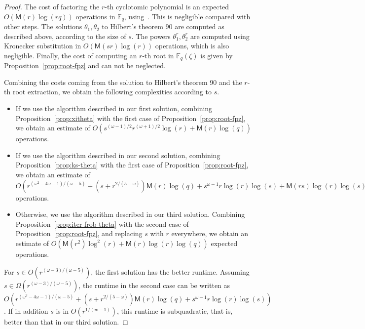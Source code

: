 \documentclass[12pt]{article}
\theoremstyle{plain}
\theoremstyle{definition}
\def\F{\ensuremath{\mathbb{F}}}
\def\MM{\ensuremath{\mathsf{M}}}
\newcounter{algorithm}
\begin{document}
\begin{proof}
  The cost of factoring the $r$-th cyclotomic polynomial is an
  expected $O(\MM(r)\log(rq))$ operations in $\F_q$,
  using~\cite[Theorem~9]{shoup94}. This is negligible compared with
  other steps. The solutions $\theta_1,\theta_2$ to Hilbert's theorem
  90 are computed as described above, according to the size of $s$.
  The powers $\theta_1^r,\theta_2^r$ are computed using Kronecker
  substitution in $O(\MM(sr)\log(r))$ operations, which is also
  negligible. Finally, the cost of computing an $r$-th root in
  $\F_q(\zeta)$ is given by Proposition~\ref{prop:root-fpz} and can
  not be neglected.

  Combining the costs coming from the solution to Hilbert's theorem 90
  and the $r$-th root extraction, we obtain the following complexities
  according to $s$.
  \begin{itemize}
  \item If we use the algorithm described in
    our first solution, combining Proposition~\ref{prop:xitheta} with the first
    case of Proposition~\ref{prop:root-fpz}, we obtain an estimate of
    $O(s^{(\omega-1)/2}r^{(\omega+1)/2}\log(r)+\MM(r)\log(q))$
    operations.
  \item If we use the algorithm described in
    our second solution, combining Proposition~\ref{prop:ks-theta} with the first
    case of Proposition~\ref{prop:root-fpz}, we obtain an estimate of
    $O( r^{(\omega^2-4\omega-1)/(\omega-5)}+(s+r^{2/(5-\omega)})\MM(r)\log(q)
+s^{\omega-1}r\log(r)\log(s)+\MM(rs)\log(r)\log(s))$
    operations.
  \item Otherwise, we use the algorithm described in our third solution. Combining
    Proposition~\ref{prop:iter-frob-theta} with the second case of
    Proposition~\ref{prop:root-fpz}, and replacing $s$ with $r$
    everywhere, we obtain an estimate of
    $O(\MM(r^2)\log^2(r) + \MM(r)\log(r)\log(q)) $ expected operations.
  \end{itemize}
  For $s\in O(r^{(\omega-3)/(\omega-5)})$, the first solution has the
  better runtime. Assuming $s\in \Omega(r^{(\omega-3)/(\omega-5)})$,
  the runtime in the second case can be written as $O(
  r^{(\omega^2-4\omega-1)/(\omega-5)}+(s+r^{2/(5-\omega)})\MM(r)\log(q)
  +s^{\omega-1}r\log(r)\log(s))$. If in addition $s$ is in $O(r^{1/(w-1)})$,
  this runtime is subquadratic, that is, better than that in our third solution.
\end{proof}
\end{document}
